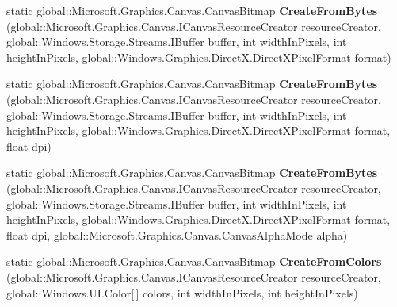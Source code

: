 \begin{DoxyCompactItemize}
\item 
\mbox{\label{class_microsoft_1_1_graphics_1_1_canvas_1_1_canvas_bitmap_a2168a3d89e47f661342d1550456b8f68}} 
static global\+::\+Microsoft.\+Graphics.\+Canvas.\+Canvas\+Bitmap {\bfseries Create\+From\+Bytes} (global\+::\+Microsoft.\+Graphics.\+Canvas.\+I\+Canvas\+Resource\+Creator resource\+Creator, global\+::\+Windows.\+Storage.\+Streams.\+I\+Buffer buffer, int width\+In\+Pixels, int height\+In\+Pixels, global\+::\+Windows.\+Graphics.\+Direct\+X.\+Direct\+X\+Pixel\+Format format)
\item 
\mbox{\label{class_microsoft_1_1_graphics_1_1_canvas_1_1_canvas_bitmap_af1daa19ada592de34b02ac1e97e88606}} 
static global\+::\+Microsoft.\+Graphics.\+Canvas.\+Canvas\+Bitmap {\bfseries Create\+From\+Bytes} (global\+::\+Microsoft.\+Graphics.\+Canvas.\+I\+Canvas\+Resource\+Creator resource\+Creator, global\+::\+Windows.\+Storage.\+Streams.\+I\+Buffer buffer, int width\+In\+Pixels, int height\+In\+Pixels, global\+::\+Windows.\+Graphics.\+Direct\+X.\+Direct\+X\+Pixel\+Format format, float dpi)
\item 
\mbox{\label{class_microsoft_1_1_graphics_1_1_canvas_1_1_canvas_bitmap_a86cbc0abd68451ea818e39d8079e60c9}} 
static global\+::\+Microsoft.\+Graphics.\+Canvas.\+Canvas\+Bitmap {\bfseries Create\+From\+Bytes} (global\+::\+Microsoft.\+Graphics.\+Canvas.\+I\+Canvas\+Resource\+Creator resource\+Creator, global\+::\+Windows.\+Storage.\+Streams.\+I\+Buffer buffer, int width\+In\+Pixels, int height\+In\+Pixels, global\+::\+Windows.\+Graphics.\+Direct\+X.\+Direct\+X\+Pixel\+Format format, float dpi, global\+::\+Microsoft.\+Graphics.\+Canvas.\+Canvas\+Alpha\+Mode alpha)
\item 
\mbox{\label{class_microsoft_1_1_graphics_1_1_canvas_1_1_canvas_bitmap_aa56711d36aa2bc46baefdbf6ca694427}} 
static global\+::\+Microsoft.\+Graphics.\+Canvas.\+Canvas\+Bitmap {\bfseries Create\+From\+Colors} (global\+::\+Microsoft.\+Graphics.\+Canvas.\+I\+Canvas\+Resource\+Creator resource\+Creator, global\+::\+Windows.\+U\+I.\+Color\mbox{[}$\,$\mbox{]} colors, int width\+In\+Pixels, int height\+In\+Pixels)
\item 

\end{DoxyCompactItemize}

